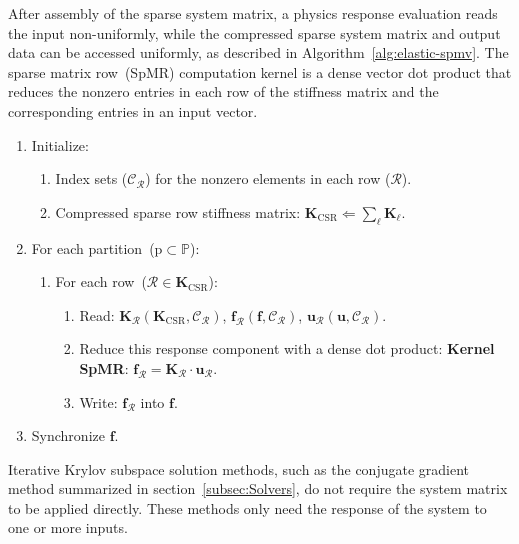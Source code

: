 \documentclass[]             %
{NASA}                       %
\begin{document}
After assembly of the sparse system matrix, a physics response evaluation
 reads the input non-uniformly, while the compressed sparse system matrix
 and output data can be accessed uniformly, as described in Algorithm~\ref{alg:elastic-spmv}.
 The sparse matrix row~(SpMR) computation kernel is a dense vector dot product that reduces the nonzero entries in each row of the stiffness matrix and the corresponding entries in an input vector.
\begin{algorithm}[ht]%
\caption{Linear response SpMV~physics evaluation}
\label{alg:elastic-spmv}
\begin{enumerate}
\item Initialize:
\begin{enumerate}
\item Index sets ($\mathcal{C}_\mathcal{R}$) for the nonzero elements in each row ($\mathcal{R}$).
\item Compressed sparse row stiffness matrix: $\mathbf{K_{\mathrm{CSR}}} \Leftarrow \sum_{\ell}\mathbf{K}_{\ell}$.
\end{enumerate}
\item For each partition~($\mathrm{p} \subset \mathbb{P}$):
\begin{enumerate}
\item For each row~(${\mathcal{R}}\in\mathbf{K_{\mathrm{CSR}}}$):
\begin{enumerate}
\item Read: $\mathbf{K}_\mathcal{R}(\mathbf{K_{\mathrm{CSR}}},\mathcal{C}_\mathcal{R})$,
$\mathbf{f_\mathcal{R}(\mathbf{f},\mathcal{C}_\mathcal{R})}$,
$\mathbf{u}_\mathcal{R}(\mathbf{u},\mathcal{C}_\mathcal{R})$.
\item Reduce this response component with a dense dot product:
\newline
\textbf{Kernel SpMR}: $\mathbf{f}_{\mathcal{R}}=\mathbf{K}_{\mathcal{R}}\cdot{\mathbf{u}}_{\mathcal{R}}$.
\item Write: $\mathbf{f}_{\mathcal{R}}$ into ${\mathbf{f}}$.
\end{enumerate}
\end{enumerate}
\item Synchronize $\mathbf{f}$.
\end{enumerate}
\end{algorithm}

Iterative Krylov subspace solution methods, such as the conjugate gradient
 method summarized in section~\ref{subsec:Solvers}, do not require the system matrix to be applied directly.
 These methods only need the response of the system to one or more inputs.
\end{document}
